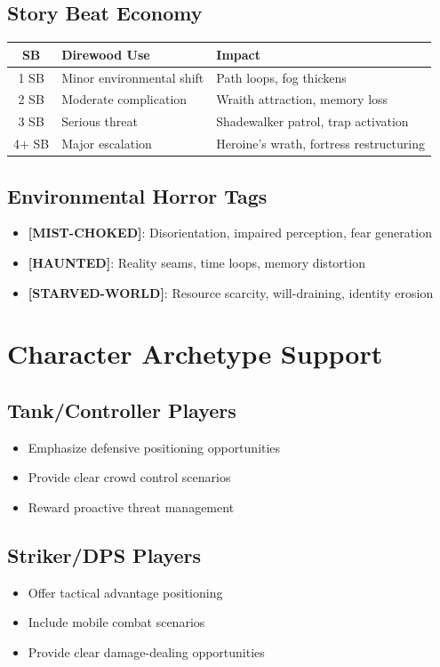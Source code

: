 \documentclass[11pt]{article}
\begin{document}
\subsection{Story Beat Economy}

\centering
\begin{longtable}{|c|l|l|}
\hline
\textbf{SB} & \textbf{Direwood Use} & \textbf{Impact} \\
\hline
1 SB & Minor environmental shift & Path loops, fog thickens \\
2 SB & Moderate complication & Wraith attraction, memory loss \\
3 SB & Serious threat & Shadewalker patrol, trap activation \\
4+ SB & Major escalation & Heroine's wrath, fortress restructuring \\
\hline
\end{longtable}
\caption{Direwood Story Beat Applications}


\subsection{Environmental Horror Tags}
\begin{itemize}
    \item \textbf{[MIST-CHOKED]}: Disorientation, impaired perception, fear generation
    \item \textbf{[HAUNTED]}: Reality seams, time loops, memory distortion
    \item \textbf{[STARVED-WORLD]}: Resource scarcity, will-draining, identity erosion
\end{itemize}

\section{Character Archetype Support}

\subsection{Tank/Controller Players}
\begin{itemize}
    \item Emphasize defensive positioning opportunities
    \item Provide clear crowd control scenarios
    \item Reward proactive threat management
\end{itemize}

\subsection{Striker/DPS Players}
\begin{itemize}
    \item Offer tactical advantage positioning
    \item Include mobile combat scenarios
    \item Provide clear damage-dealing opportunities
\end{itemize}
\end{document}
